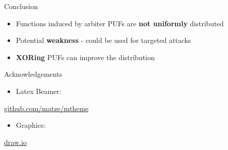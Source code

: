 \documentclass[10pt, compress]{beamer}
\begin{document}
\begin{frame}{Conclusion}
    \begin{itemize}[itemsep=1cm]
        \item Functions induced by arbiter PUFs are \textbf{not uniformly} distributed
        \item Potential \textbf{weakness} - could be used for targeted attacks
        \item \textbf{XORing} PUFs can improve the distribution
    \end{itemize}
\end{frame}

\begin{frame}{Acknowledgements}
    \begin{itemize}
        \item Latex Beamer:
    \end{itemize}
    \begin{center}\url{github.com/matze/mtheme}\end{center}
    \begin{itemize}
        \item Graphics:
    \end{itemize}    \begin{center}\url{draw.io}\end{center}
\end{frame}


\end{document}
